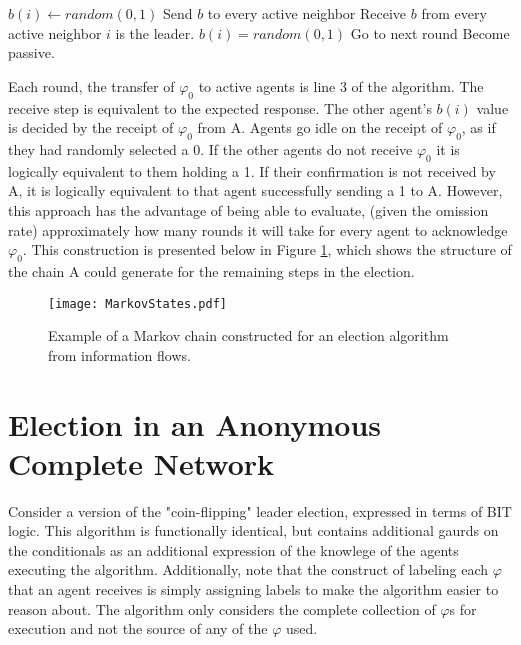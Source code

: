 \begin{algorithmic}[1]
\small
\State $b(i) \gets random(0,1)$
\State Send $b$ to every active neighbor
\State Receive $b$ from every active neighbor
	\State $i$ is the leader.
		\State $b(i) = random(0,1)$
		\State Go to next round
		\State Become passive.
	\EndIf
\end{algorithmic}

Each round, the transfer of $\varphi_0$ to active agents is line 3 of the algorithm. The receive step is equivalent to the expected response. The other agent's $b(i)$ value is decided by the receipt of $\varphi_0$ from A. Agents go idle on the receipt of $\varphi_0$, as if they had randomly selected a 0. If the other agents do not receive $\varphi_0$ it is logically equivalent to them holding a 1. If their confirmation is not received by A, it is logically equivalent to that agent successfully sending a 1 to A. However, this approach has the advantage of being able to evaluate, (given the omission rate) approximately how many rounds it will take for every agent to acknowledge $\varphi_0$. This construction is presented below in Figure \ref{fig:markovstates}, which shows the structure of the chain A could generate for the remaining steps in the election.

\begin{figure}
\begin{centering}
\texttt{[image: MarkovStates.pdf]}
\caption{Example of a Markov chain constructed for an election algorithm from information flows.}
\label{fig:markovstates}
\end{centering}
\end{figure}

\section{Election in an Anonymous Complete Network}

Consider a version of the "coin-flipping" leader election, expressed in terms of BIT logic.
This algorithm is functionally identical, but contains additional gaurds on the conditionals as an additional expression of the knowlege of the agents executing the algorithm.
Additionally, note that the construct of labeling each $\varphi$ that an agent receives is simply assigning labels to make the algorithm easier to reason about.
The algorithm only considers the complete collection of $\varphi$s for execution and not the source of any of the $\varphi$ used.

